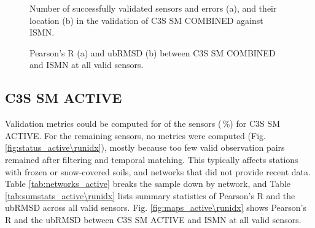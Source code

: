 \begin{figure}[ht!]
\centering
\begin{minipage}[c]{0.34\textwidth}
    \centering
    \subcaption{} %
\end{minipage}%
\hfill
\begin{minipage}[c]{0.64\textwidth}
    \centering
    \subcaption{} %
\end{minipage}
\caption{Number of successfully validated sensors and errors (a), and their location (b) in the validation of \ac{C3S} SM COMBINED against \ac{ISMN}.}
\label{fig:status_combined\runidx}
\end{figure}

\begin{figure}[ht!]
\centering
\begin{subfigure}{\textwidth}
    \centering
    \caption{}
\end{subfigure}
\medskip
\begin{subfigure}{\textwidth}
    \centering
    \caption{}
\end{subfigure}
\caption{Pearson's R (a) and \ac{ubRMSD} (b) between \ac{C3S} SM COMBINED and \ac{ISMN} at all valid sensors.}
\label{fig:maps_combined\runidx}
\end{figure}

\FloatBarrier

\subsection{\ac{C3S} SM ACTIVE} \label{ssec:results_active}

\noindent Validation metrics could be computed for \textbf{} of the  sensors (\,\%) for \ac{C3S} SM ACTIVE.
For the remaining  sensors, no metrics were computed (Fig. \ref{fig:status_active\runidx}), mostly because too few valid observation pairs remained after filtering and temporal matching.
This typically affects stations with frozen or snow-covered soils, and networks that did not provide recent data.
Table \ref{tab:networks_active} breaks the sample down by network, and Table \ref{tab:sumstats_active\runidx} lists summary statistics of Pearson's R and the \ac{ubRMSD} across all valid sensors.
Fig. \ref{fig:maps_active\runidx} shows Pearson's R and the \ac{ubRMSD} between \ac{C3S} SM ACTIVE and \ac{ISMN} at all valid sensors.

